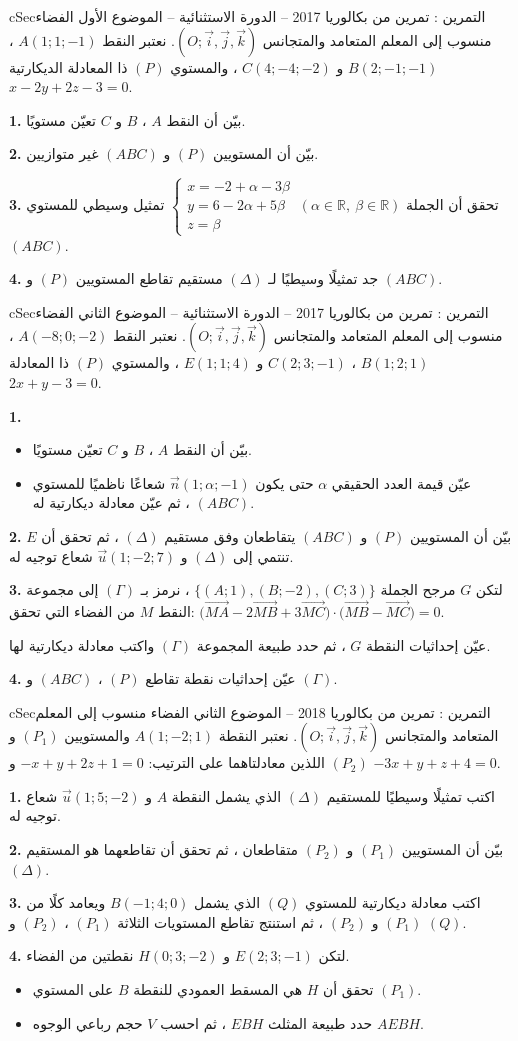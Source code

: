 \documentclass[12pt,a4paper]{article}
\newenvironment{BOX}[2]{\begin{otherlanguage}{english}\begin{arbox}{#1}{#2}}{\end{arbox}\end{otherlanguage}}
\newcounter{exo}
\newenvironment{tamrin}[1]{\stepcounter{exo}\begin{BOX}{cSec}{التمرين \theexo: #1}}{\end{BOX}}
\newcommand{\R}{\mathbb{R}}
\newenvironment{sq}{\begin{itemize}[leftmargin=2.4em,itemsep=3pt]}{\end{itemize}}
\newcommand{\qa}{\item[(أ)]}\newcommand{\qb}{\item[(ب)]}\newcommand{\qc}{\item[(جـ)]}\newcommand{\qd}{\item[(د)]}\newcommand{\qe}{\item[(هـ)]}
\newcommand{\QQ}[1]{\par\smallskip\textbf{#1.} }
\newcommand{\V}[1]{\overrightarrow{#1}}
\newcommand{\Rep}{(O;\vec i,\vec j,\vec k)}
\newcommand{\Sys}[1]{\left\{\begin{array}{l}#1\end{array}\right.}
\begin{document}
\begin{tamrin}{تمرين من بكالوريا 2017 -- الدورة الاستثنائية -- الموضوع الأول}
الفضاء منسوب إلى المعلم المتعامد والمتجانس $\Rep$. نعتبر النقط $A(1;1;-1)$ ، $B(2;-1;-1)$ و $C(4;-4;-2)$ ، والمستوي $(P)$ ذا المعادلة الديكارتية $x-2y+2z-3=0$.
\QQ{1} بيّن أن النقط $A$ ، $B$ و $C$ تعيّن مستويًا.
\QQ{2} بيّن أن المستويين $(P)$ و $(ABC)$ غير متوازيين.
\QQ{3} تحقق أن الجملة $\Sys{x=-2+\alpha-3\beta\\y=6-2\alpha+5\beta\\z=\beta}\ (\alpha\in\R,\ \beta\in\R)$ تمثيل وسيطي للمستوي $(ABC)$.
\QQ{4} جد تمثيلًا وسيطيًا لـ $(\Delta)$ مستقيم تقاطع المستويين $(P)$ و $(ABC)$.
\end{tamrin}
\begin{tamrin}{تمرين من بكالوريا 2017 -- الدورة الاستثنائية -- الموضوع الثاني}
الفضاء منسوب إلى المعلم المتعامد والمتجانس $\Rep$. نعتبر النقط $A(-8;0;-2)$ ، $B(1;2;1)$ ، $C(2;3;-1)$ و $E(1;1;4)$ ، والمستوي $(P)$ ذا المعادلة $2x+y-3=0$.
\QQ{1}
\begin{sq}
\qa بيّن أن النقط $A$ ، $B$ و $C$ تعيّن مستويًا.
\qb عيّن قيمة العدد الحقيقي $\alpha$ حتى يكون $\vec n(1;\alpha;-1)$ شعاعًا ناظميًا للمستوي $(ABC)$ ، ثم عيّن معادلة ديكارتية له.
\end{sq}
\QQ{2} بيّن أن المستويين $(P)$ و $(ABC)$ يتقاطعان وفق مستقيم $(\Delta)$ ، ثم تحقق أن $E$ تنتمي إلى $(\Delta)$ و $\vec u(1;-2;7)$ شعاع توجيه له.
\QQ{3} لتكن $G$ مرجح الجملة $\{(A;1),(B;-2),(C;3)\}$ ، نرمز بـ $(\Gamma)$ إلى مجموعة النقط $M$ من الفضاء التي تحقق: $\big(\V{MA}-2\V{MB}+3\V{MC}\big)\cdot\big(\V{MB}-\V{MC}\big)=0$.
\par عيّن إحداثيات النقطة $G$ ، ثم حدد طبيعة المجموعة $(\Gamma)$ واكتب معادلة ديكارتية لها.
\QQ{4} عيّن إحداثيات نقطة تقاطع $(P)$ ، $(ABC)$ و $(\Gamma)$.
\end{tamrin}
\begin{tamrin}{تمرين من بكالوريا 2018 -- الموضوع الثاني}
الفضاء منسوب إلى المعلم المتعامد والمتجانس $\Rep$. نعتبر النقطة $A(1;-2;1)$ والمستويين $(P_1)$ و $(P_2)$ اللذين معادلتاهما على الترتيب: $-x+y+2z+1=0$ و $-3x+y+z+4=0$.
\QQ{1} اكتب تمثيلًا وسيطيًا للمستقيم $(\Delta)$ الذي يشمل النقطة $A$ و $\vec u(1;5;-2)$ شعاع توجيه له.
\QQ{2} بيّن أن المستويين $(P_1)$ و $(P_2)$ متقاطعان ، ثم تحقق أن تقاطعهما هو المستقيم $(\Delta)$.
\QQ{3} اكتب معادلة ديكارتية للمستوي $(Q)$ الذي يشمل $B(-1;4;0)$ ويعامد كلًا من $(P_1)$ و $(P_2)$ ، ثم استنتج تقاطع المستويات الثلاثة $(P_1)$ ، $(P_2)$ و $(Q)$.
\QQ{4} لتكن $E(2;3;-1)$ و $H(0;3;-2)$ نقطتين من الفضاء.
\begin{sq}
\qa تحقق أن $H$ هي المسقط العمودي للنقطة $B$ على المستوي $(P_1)$.
\qb حدد طبيعة المثلث $EBH$ ، ثم احسب $V$ حجم رباعي الوجوه $AEBH$.
\end{sq}
\end{tamrin}
\end{document}
